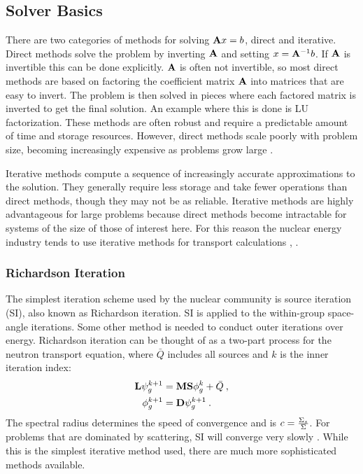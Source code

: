 \subsection{Solver Basics}
There are two categories of methods for solving $\mathbf{A}x = b$, direct and iterative. Direct methods solve the problem by inverting $\mathbf{A}$ and setting $x = \mathbf{A}^{-1}b$. If $\mathbf{A}$ is invertible this can be done explicitly. $\mathbf{A}$ is often not invertible, so most direct methods are based on factoring the coefficient matrix $\mathbf{A}$ into matrices that are easy to invert. The problem is then solved in pieces where each factored matrix is inverted to get the final solution. An example where this is done is LU factorization. These methods are often robust and require a predictable amount of time and storage resources. However, direct methods scale poorly with problem size, becoming increasingly expensive as problems grow large \cite{Benzi2002}.

Iterative methods compute a sequence of increasingly accurate approximations to the solution. They generally require less storage and take fewer operations than direct methods, though they may not be as reliable. Iterative methods are highly advantageous for large problems because direct methods become intractable for systems of the size of those of interest here. For this reason the nuclear energy industry tends to use iterative methods for transport calculations \cite{Birkhoff1984}, \cite{Benzi2002}. 

\subsubsection{Richardson Iteration}
The simplest iteration scheme used by the nuclear community is source iteration (SI), also known as Richardson iteration. SI is applied to the within-group space-angle iterations. Some other method is needed to conduct outer iterations over energy. Richardson iteration can be thought of as a two-part process for the neutron transport equation, where $\bar{Q}$ includes all sources and $k$ is the inner iteration index:
%
\begin{align}
  \mathbf{L}\psi_g^{k+1} &= \mathbf{MS} \phi_g^k + \bar{Q} \:,   \label{eq:SIpsi} \\
  \phi_g^{k+1} &= \mathbf{D}\psi_g^{k+1} \:.
  \label{eq:SIphi}
\end{align}
%
The spectral radius determines the speed of convergence and is $c = \frac{\Sigma_s}{\Sigma}$. For problems that are dominated by scattering, SI will converge very slowly \cite{Evans2009d}. While this is the simplest iterative method used, there are much more sophisticated methods available. 

